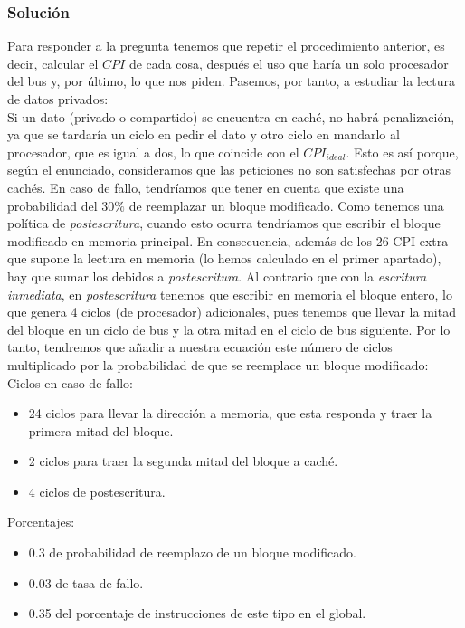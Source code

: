 \documentclass[12pt,a4paper]{article}
\begin{document}
\subsubsection{Solución}

Para responder a la pregunta tenemos que repetir el procedimiento anterior, es decir, calcular el $CPI$ de cada cosa, después el uso que haría un solo procesador del bus y, por último, lo que nos piden. Pasemos, por tanto, a estudiar la lectura de datos privados:\\

Si un dato (privado o compartido) se encuentra en caché, no habrá penalización, ya que se tardaría un ciclo en pedir el dato y otro ciclo en mandarlo al procesador, que es igual a dos, lo que coincide con el $CPI_{ideal}$. Esto es así porque, según el enunciado, consideramos que las peticiones no son satisfechas por otras cachés. En caso de fallo, tendríamos que tener en cuenta que existe una probabilidad del $30\%$ de reemplazar un bloque modificado. Como tenemos una política de \textit{postescritura}, cuando esto ocurra tendríamos que escribir el bloque modificado en memoria principal. En consecuencia, además de los 26 CPI extra que supone la lectura en memoria (lo hemos calculado en el primer apartado), hay que sumar los debidos a \textit{postescritura}. Al contrario que con la \textit{escritura inmediata}, en \textit{postescritura} tenemos que escribir en memoria el bloque entero, lo que genera 4 ciclos (de procesador) adicionales, pues tenemos que llevar la mitad del bloque en un ciclo de bus y la otra mitad en el ciclo de bus siguiente. Por lo tanto, tendremos que añadir a nuestra ecuación este número de ciclos multiplicado por la probabilidad de que se reemplace un bloque modificado:\\

Ciclos en caso de fallo:
\begin{itemize}
\item 24 ciclos para llevar la dirección a memoria, que esta responda y traer la primera mitad del bloque.
\item 2 ciclos para traer la segunda mitad del bloque a caché.
\item 4 ciclos de postescritura.
\end{itemize}

Porcentajes:
\begin{itemize}
\item 0.3 de probabilidad de reemplazo de un bloque modificado.
\item 0.03 de tasa de fallo.
\item 0.35 del porcentaje de instrucciones de este tipo en el global.
\end{itemize}
\end{document}
